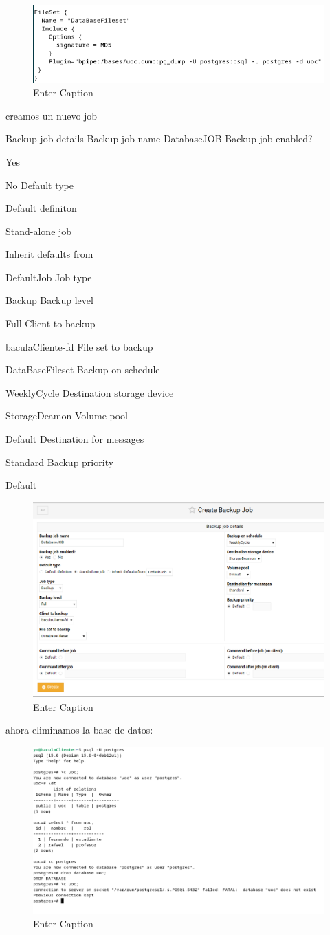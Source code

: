 \begin{figure}[H]
    \centering
    \includegraphics[width=0.5\linewidth]{instalacionBacula/filesetBpipe.png}
    \caption{Enter Caption}
\end{figure}
creamos un nuevo job

Backup job details
Backup job name
DatabaseJOB
Backup job enabled?

  Yes 
 
  No 
Default type

  Default definiton 
 
  Stand-alone job 
 
  Inherit defaults from 

DefaultJob
Job type

Backup
Backup level

Full
Client to backup

baculaCliente-fd
File set to backup

DataBaseFileset
Backup on schedule

WeeklyCycle
Destination storage device

StorageDeamon
Volume pool

Default
Destination for messages

Standard
Backup priority

  Default 
 
\begin{figure}[H]
     \centering
     \includegraphics[width=0.5\linewidth]{instalacionBacula/databaseJOB.png}
     \caption{Enter Caption}
 \end{figure} 
 



ahora eliminamos la base de datos:

\begin{figure}[H]
    \centering
    \includegraphics[width=0.5\linewidth]{instalacionBacula/dropdatabase.png}
    \caption{Enter Caption}
\end{figure}

